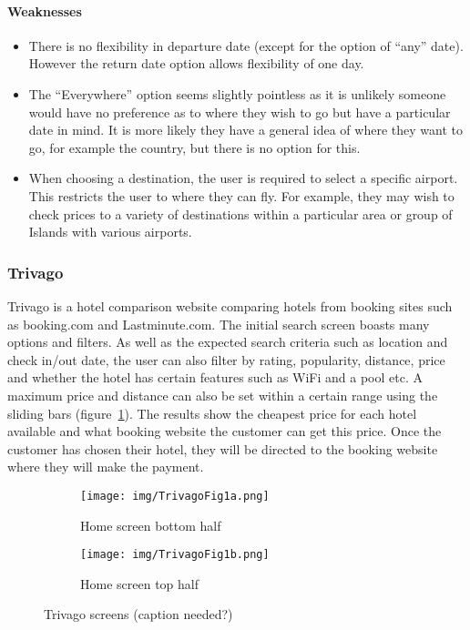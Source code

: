 \paragraph{Weaknesses}

\begin{itemize}
	\item There is no flexibility in departure date (except for the option of
		``any'' date). However the return date option allows flexibility of one
		day.
	\item The ``Everywhere'' option seems slightly pointless as it is unlikely
		someone would have no preference as to where they wish to go but have a
		particular date in mind. It is more likely they have a general idea of
		where they want to go, for example the country, but there is no option
		for
		this.
	\item When choosing a destination, the user is required to select a
		specific airport. This restricts the user to where they can fly. For
		example, they may wish to check prices to a variety of destinations
		within a particular area or group of Islands with various airports.
\end{itemize}

\subsubsection{Trivago}
\label{ssub:trivago}

Trivago is a hotel comparison website comparing hotels from booking sites such
as booking.com and Lastminute.com. The initial search screen boasts many
options and filters. As well as the expected search criteria such as location
and check in/out date, the user can also filter by rating, popularity,
distance, price and whether the hotel has certain features such as WiFi and a
pool etc. A maximum price and distance can also be set within a certain range
using the sliding bars (figure~\ref{fig:trivago1}). The results show the
cheapest price for each hotel available and what booking website the customer
can get this price. Once the customer has chosen their hotel, they will be
directed to the booking website where they will make the payment.
\begin{figure}[ht]
    \centering
    \begin{subfigure}[b]{0.2\textwidth}
        \texttt{[image: img/TrivagoFig1a.png]}
        \caption{Home screen bottom half}
    \end{subfigure}
    \qquad
    \begin{subfigure}[b]{0.2\textwidth}
        \texttt{[image: img/TrivagoFig1b.png]}
        \caption{Home screen top half}
    \end{subfigure}
    \caption{Trivago screens (caption needed?)}\label{fig:trivago1}
\end{figure}

